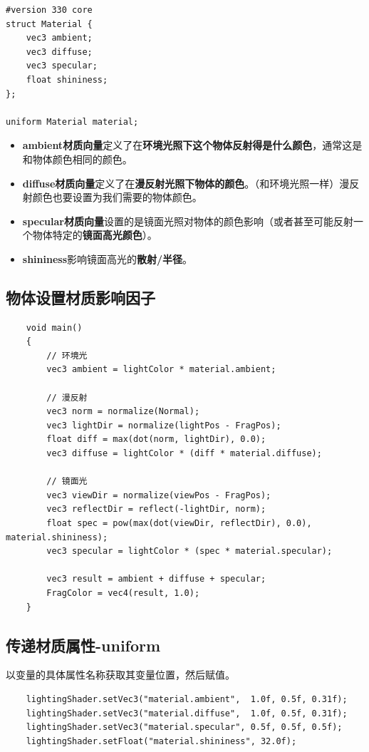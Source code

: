 \documentclass[UTF8,a4paper,12pt]{ctexbook}
\begin{document}
		\begin{lstlisting}
#version 330 core
struct Material {
	vec3 ambient;
	vec3 diffuse;
	vec3 specular;
	float shininess;
}; 

uniform Material material;		
		\end{lstlisting}
		
		\begin{itemize}
			\item \textbf{ambient材质向量}定义了在\textbf{环境光照下这个物体反射得是什么颜色}，通常这是和物体颜色相同的颜色。
			\item \textbf{diffuse材质向量}定义了在\textbf{漫反射光照下物体的颜色}。（和环境光照一样）漫反射颜色也要设置为我们需要的物体颜色。
			\item \textbf{specular材质向量}设置的是镜面光照对物体的颜色影响（或者甚至可能反射一个物体特定的\textbf{镜面高光颜色}）。
			\item \textbf{shininess}影响镜面高光的\textbf{散射/半径}。
		\end{itemize}
		
		\subsection{物体设置材质影响因子}
			\begin{lstlisting}
	void main()
	{    
	    // 环境光
	    vec3 ambient = lightColor * material.ambient;
	
	    // 漫反射 
	    vec3 norm = normalize(Normal);
	    vec3 lightDir = normalize(lightPos - FragPos);
	    float diff = max(dot(norm, lightDir), 0.0);
	    vec3 diffuse = lightColor * (diff * material.diffuse);
	
	    // 镜面光
	    vec3 viewDir = normalize(viewPos - FragPos);
	    vec3 reflectDir = reflect(-lightDir, norm);  
	    float spec = pow(max(dot(viewDir, reflectDir), 0.0), material.shininess);
	    vec3 specular = lightColor * (spec * material.specular);  
	
	    vec3 result = ambient + diffuse + specular;
	    FragColor = vec4(result, 1.0);
	}	
			\end{lstlisting}
		
		
		\subsection{传递材质属性-uniform}
		
			以变量的具体属性名称获取其变量位置，然后赋值。
		
			\begin{lstlisting}
	lightingShader.setVec3("material.ambient",  1.0f, 0.5f, 0.31f);
	lightingShader.setVec3("material.diffuse",  1.0f, 0.5f, 0.31f);
	lightingShader.setVec3("material.specular", 0.5f, 0.5f, 0.5f);
	lightingShader.setFloat("material.shininess", 32.0f);			
			\end{lstlisting}
		
\end{document}

